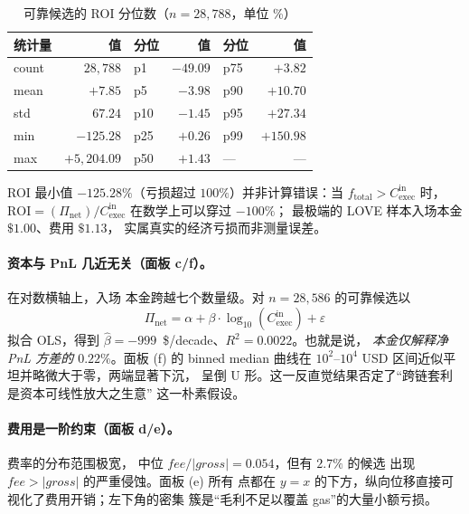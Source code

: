 \documentclass[sigconf,nonacm,10pt]{acmart}
\newcommand{\Cexec}{C_{\text{exec}}}
\newcommand{\Pnet}{\Pi_{\text{net}}}
\begin{document}
\begin{table}[h]
  \centering
  \small
  \caption{可靠候选的 ROI 分位数（$n=28{,}788$，单位 \%）}
  \label{tab:roi-quantiles}
  \begin{tabular}{lr|lr|lr}
    \toprule
    \textbf{统计量} & \textbf{值} & \textbf{分位} & \textbf{值} & \textbf{分位} & \textbf{值} \\
    \midrule
    count & $28{,}788$ & p1   & $-49.09$ & p75 & $+3.82$ \\
    mean  & $+7.85$    & p5   & $-3.98$  & p90 & $+10.70$ \\
    std   & $67.24$    & p10  & $-1.45$  & p95 & $+27.34$ \\
    min   & $-125.28$  & p25  & $+0.26$  & p99 & $+150.98$ \\
    max   & $+5{,}204.09$ & p50 & $+1.43$ & --- & --- \\
    \bottomrule
  \end{tabular}
\end{table}

ROI 最小值 $-125.28\%$（亏损超过 $100\%$）并非计算错误：当
$f_{\text{total}}>\Cexec^{\text{in}}$ 时，
$\text{ROI}=(\Pnet)/\Cexec^{\text{in}}$ 在数学上可以穿过 $-100\%$；
最极端的 LOVE 样本入场本金 $\$1.00$、费用 $\$1.13$，
实属真实的经济亏损而非测量误差。

\paragraph{资本与 PnL 几近无关（面板 c/f）。} 在对数横轴上，入场
本金跨越七个数量级。对 $n=28{,}586$ 的可靠候选以
\begin{equation}
  \Pnet = \alpha + \beta\cdot\log_{10}(\Cexec^{\text{in}}) + \varepsilon
  \label{eq:ols}
\end{equation}
拟合 OLS，得到 $\hat\beta=-999$~\$/decade、$R^2=0.0022$。也就是说，
\emph{本金仅解释净 PnL 方差的 $0.22\%$}。面板 (f) 的 binned median
曲线在 $10^2$--$10^4$ USD 区间近似平坦并略微大于零，两端显著下沉，
呈倒 U 形。这一反直觉结果否定了“跨链套利是资本可线性放大之生意”
这一朴素假设。

\paragraph{费用是一阶约束（面板 d/e）。} 费率的分布范围极宽，
中位 $\mathit{fee}/|\mathit{gross}|=0.054$，但有 $2.7\%$ 的候选
出现 $\mathit{fee}>|\mathit{gross}|$ 的严重侵蚀。面板 (e) 所有
点都在 $y=x$ 的下方，纵向位移直接可视化了费用开销；左下角的密集
簇是“毛利不足以覆盖 gas”的大量小额亏损。
\end{document}
